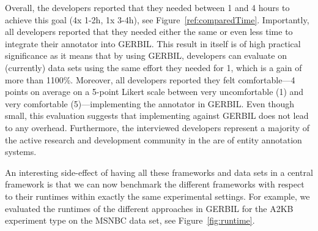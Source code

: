 Overall, the developers reported that they needed between 1 and 4 hours to achieve this goal (4x 1-2h, 1x 3-4h), see Figure~\ref{ref:comparedTime}.
Importantly, all developers reported that they needed either the same or even less time to integrate their annotator into GERBIL.
This result in itself is of high practical significance as it means that by using GERBIL, developers can evaluate on (currently) \overalldatasets data sets using the same effort they needed for 1, which is a gain of more than 1100\%.
Moreover, all developers reported they felt comfortable---4 points on average on a 5-point Likert scale between very uncomfortable (1) and very comfortable (5)---implementing the annotator in GERBIL.
Even though small, this evaluation suggests that implementing against GERBIL does not lead to any overhead.
Furthermore, the interviewed developers represent a majority of the active research and development community in the are of entity annotation systems.

An interesting side-effect of having all these frameworks and data sets in a central framework is that we can now benchmark the different frameworks with respect to their runtimes within exactly the same experimental settings. 
For example, we evaluated the runtimes of the different approach\-es in GERBIL for the A2KB experiment type on the MSNBC data set, see Figure~\ref{fig:runtime}.


